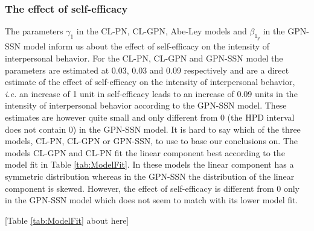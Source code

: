\documentclass[man,mask]{apa6}
\begin{document}
\subsubsection{The effect of self-efficacy}

The parameters \(\gamma_1\) in the CL-PN, CL-GPN, Abe-Ley models and \(\beta_{1_y}\)
in the GPN-SSN model inform us about the effect of self-efficacy on the intensity
of interpersonal behavior. For the CL-PN, CL-GPN and GPN-SSN model the
parameters are estimated at 0.03, 0.03 and 0.09 respectively and are a direct
estimate of the effect of self-efficacy on the intensity of interpersonal
behavior, \emph{i.e.} an increase of 1 unit in self-efficacy leads to an
increase of 0.09 units in the intensity of interpersonal behavior according to
the GPN-SSN model. These estimates are however quite small and only different
from 0 (the HPD interval does not contain 0) in the GPN-SSN model. It is hard to
say which of the three models, CL-PN, CL-GPN or GPN-SSN, to use to base our
conclusions on. The models CL-GPN and CL-PN fit the linear component best according
to the model fit in Table \ref{tab:ModelFit}. In these models the linear component has a
symmetric distribution whereas in the GPN-SSN the distribution of the linear
component is skewed. However, the effect of self-efficacy is different from 0 only
in the GPN-SSN model which does not seem to match with its lower model fit.

\hfil [Table \ref{tab:ModelFit} about here] \hfil
\end{document}
